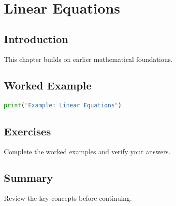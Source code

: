 \chapter{Linear Equations}
\label{chap:vol4-6}



\section{Introduction}
This chapter builds on earlier mathematical foundations.

\section{Worked Example}
\begin{lstlisting}[language=Python]
print("Example: Linear Equations")
\end{lstlisting}

\section{Exercises}
\begin{exercise}
Complete the worked examples and verify your answers.
\end{exercise}

\section{Summary}
Review the key concepts before continuing.
